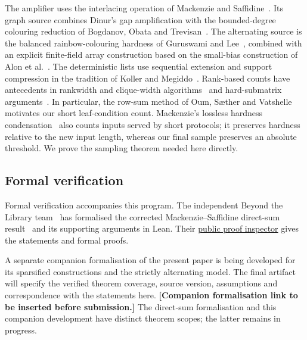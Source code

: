 \documentclass[11pt]{article} \usepackage[utf8]{inputenc}
\theoremstyle{plain} \newtheorem{theorem}{Theorem}[section]
\theoremstyle{definition} \newaliascnt{definition}{theorem}
\begin{document}
The amplifier uses the interlacing operation of Mackenzie and
Saffidine~\cite{mackenzie2025refuting}. Its graph source combines Dinur's
gap amplification with the bounded-degree colouring reduction of
Bogdanov, Obata and Trevisan~\cite{dinur2007pcp,bogdanov2002lower}.
The alternating source is the balanced rainbow-colouring hardness of
Guruswami and Lee~\cite{guruswami2018balanced}, combined with an explicit
finite-field array construction based on the small-bias construction of
Alon et al.~\cite{alon1992smallbias}. The deterministic lists use
sequential extension and support compression in the tradition of Koller
and Megiddo~\cite{koller1994sample}. Rank-based counts have antecedents
in rankwidth and clique-width algorithms~\cite{bui2010rankwidth,oum2014faster}
and hard-submatrix arguments~\cite{hrubes2025hard}. In particular, the
row-sum method of Oum, S{\ae}ther and Vatshelle~\cite{oum2014faster}
motivates our short leaf-condition count. Mackenzie's lossless hardness
condensation~\cite{mackenzie2026condensation} also counts inputs served
by short protocols; it preserves hardness relative to the new input
length, whereas our final sample preserves an absolute threshold.
We prove the sampling theorem needed here directly.

\subsection{Formal verification}
\label{sec:formal-verification}

Formal verification accompanies this program. The independent Beyond the
Library team~\cite{moakhar2026beyond} has formalised the corrected
Mackenzie--Saffidine direct-sum result~\cite{mackenzie2025refuting} and its
supporting arguments in Lean. Their
\href{https://beyondthelibrary.github.io/formal_archive/p/Refuting/}{public
proof inspector} gives the statements and formal proofs.

A separate companion formalisation of the present paper is being developed
for its sparsified constructions and the strictly alternating model.
The final artifact will specify the verified theorem coverage, source
version, assumptions and correspondence with the statements here.
\textbf{[Companion formalisation link to be inserted before submission.]}
The direct-sum formalisation and this companion development have distinct
theorem scopes; the latter remains in progress.
\end{document}
